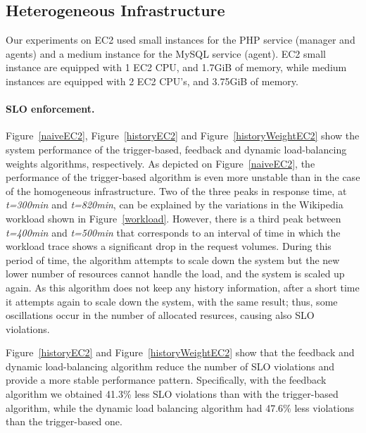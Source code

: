 


\subsection*{Heterogeneous Infrastructure}

Our experiments on EC2 used small instances for the PHP service (manager and agents) and  a medium instance for the MySQL service (agent). EC2 small instance are equipped with 1 EC2 CPU, and 1.7GiB of memory, while medium instances are equipped with 2 EC2 CPU's, and 3.75GiB of memory.


\paragraph{SLO enforcement.}
Figure~\ref{naiveEC2}, Figure~\ref{historyEC2} and Figure~\ref{historyWeightEC2} show the system performance of the trigger-based, feedback and dynamic load-balancing weights algorithms, respectively. As depicted on Figure~\ref{naiveEC2}, the performance of the trigger-based algorithm is even more unstable than in the case of the homogeneous infrastructure. Two of the three peaks in response time, at \emph{t=300min} and \emph{t=820min}, can be explained by the variations in the Wikipedia workload shown in Figure~\ref{workload}. However, there is a third peak between \emph{t=400min} and \emph{t=500min} that corresponds to an interval of time in which the workload trace shows a significant drop in the request volumes. During this period of time, the algorithm attempts to scale down the system but the new lower number of resources cannot handle the load, and the system is scaled up again. As this algorithm does not keep any history information, after a short time it attempts again to scale down the system, with the same result; thus, some oscillations occur in the number of allocated resurces, causing also SLO violations.   

Figure~\ref{historyEC2} and Figure~\ref{historyWeightEC2} show that the
feedback and dynamic load-balancing algorithm reduce the number of SLO 
violations and provide a more stable performance pattern. Specifically,
with the feedback algorithm  we obtained 41.3\% less SLO violations than
with the trigger-based algorithm, while the dynamic load balancing algorithm
had 47.6\% less violations than the trigger-based one.

